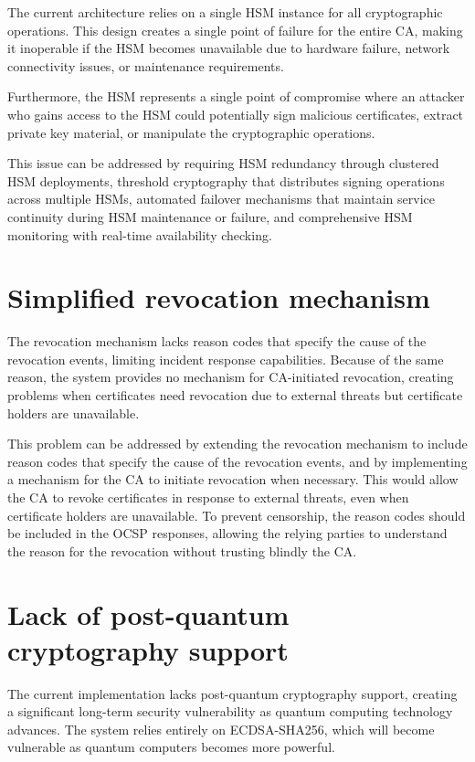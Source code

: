 The current architecture relies on a single HSM instance for all cryptographic operations. 
This design creates a single point of failure for the entire CA, making it inoperable if the HSM 
becomes unavailable due to hardware failure, network connectivity issues, or maintenance requirements.

Furthermore, the HSM represents a single point of compromise where an attacker who gains access to 
the HSM could potentially sign malicious certificates, extract private key material, or manipulate 
the cryptographic operations. 

This issue can be addressed by requiring HSM redundancy through clustered HSM deployments, threshold 
cryptography that distributes signing operations across multiple HSMs, automated failover mechanisms 
that maintain service continuity during HSM maintenance or failure, and comprehensive HSM monitoring 
with real-time availability checking. 

\section{Simplified revocation mechanism}

The revocation mechanism lacks reason codes that specify the cause of the revocation events, 
limiting incident response capabilities. Because of the same reason, the system provides no mechanism 
for CA-initiated revocation, creating problems when certificates need revocation due to external 
threats but certificate holders are unavailable.

This problem can be addressed by extending the revocation mechanism to include reason codes that specify 
the cause of the revocation events, and by implementing a mechanism for the CA to initiate revocation 
when necessary. This would allow the CA to revoke certificates in response to external threats, 
even when certificate holders are unavailable. To prevent censorship, the reason codes should be included
in the OCSP responses, allowing the relying parties to understand the reason for the revocation
without trusting blindly the CA.


\section{Lack of post-quantum cryptography support}

The current implementation lacks post-quantum cryptography support, creating a significant 
long-term security vulnerability as quantum computing technology advances. The system relies entirely 
on ECDSA-SHA256, which will become vulnerable as quantum computers becomes more powerful.

